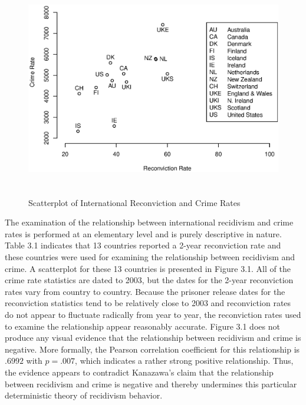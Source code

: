 \begin{figure}[b]
\begin{center}
\includegraphics[width=6in, height=3.75in, keepaspectratio=true]{graph303.eps}
\caption{Scatterplot of International Reconviction and Crime Rates}
\end{center}
\end{figure}

The examination of the relationship between international recidivism and crime rates is performed at an elementary level and is purely descriptive in nature.  Table 3.1 indicates that 13 countries reported a 2-year reconviction rate and these countries were used for examining the relationship between recidivism and crime.  A scatterplot for these 13 countries is presented in Figure 3.1.  All of the crime rate statistics are dated to 2003, but the dates for the 2-year reconviction rates vary from country to country.  Because the prisoner release dates for the reconviction statistics tend to be relatively close to 2003 and reconviction rates do not appear to fluctuate radically from year to year, the reconviction rates used to examine the relationship appear reasonably accurate.  Figure 3.1 does not produce any visual evidence that the relationship between recidivism and crime is negative.  More formally, the Pearson correlation coefficient for this relationship is $.6992$ with $p = .007$, which indicates a rather strong positive relationship.  Thus, the evidence appears to contradict Kanazawa's claim that the relationship between recidivism and crime is negative and thereby undermines this particular deterministic theory of recidivism behavior.

